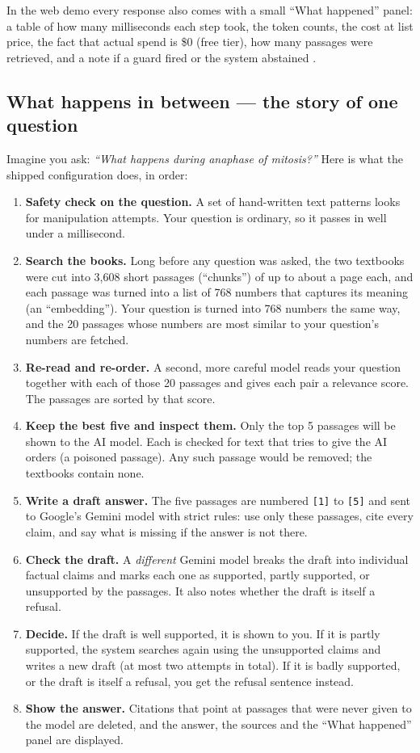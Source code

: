 In the web demo every response also comes with a small ``What happened'' panel: a table of how many milliseconds each step took, the token counts, the cost at list price, the fact that actual spend is \$0 (free tier), how many passages were retrieved, and a note if a guard fired or the system abstained .

\subsection{What happens in between --- the story of one question}

Imagine you ask: \emph{``What happens during anaphase of mitosis?''} Here is what the shipped configuration does, in order:

\begin{enumerate}
  \item \textbf{Safety check on the question.} A set of hand-written text patterns looks for manipulation attempts. Your question is ordinary, so it passes in well under a millisecond.
  \item \textbf{Search the books.} Long before any question was asked, the two textbooks were cut into 3,608 short passages (``chunks'') of up to about a page each, and each passage was turned into a list of 768 numbers that captures its meaning (an ``embedding''). Your question is turned into 768 numbers the same way, and the 20 passages whose numbers are most similar to your question's numbers are fetched.
  \item \textbf{Re-read and re-order.} A second, more careful model reads your question together with each of those 20 passages and gives each pair a relevance score. The passages are sorted by that score.
  \item \textbf{Keep the best five and inspect them.} Only the top 5 passages will be shown to the AI model. Each is checked for text that tries to give the AI orders (a poisoned passage). Any such passage would be removed; the textbooks contain none.
  \item \textbf{Write a draft answer.} The five passages are numbered \texttt{[1]} to \texttt{[5]} and sent to Google's Gemini model with strict rules: use only these passages, cite every claim, and say what is missing if the answer is not there.
  \item \textbf{Check the draft.} A \emph{different} Gemini model breaks the draft into individual factual claims and marks each one as supported, partly supported, or unsupported by the passages. It also notes whether the draft is itself a refusal.
  \item \textbf{Decide.} If the draft is well supported, it is shown to you. If it is partly supported, the system searches again using the unsupported claims and writes a new draft (at most two attempts in total). If it is badly supported, or the draft is itself a refusal, you get the refusal sentence instead.
  \item \textbf{Show the answer.} Citations that point at passages that were never given to the model are deleted, and the answer, the sources and the ``What happened'' panel are displayed.
\end{enumerate}

